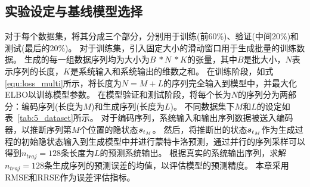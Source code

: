\subsection{实验设定与基线模型选择}
对于每个数据集，将其分成三个部分，分别用于训练(前60\%)、验证(中间20\%)和测试(最后的20\%)。
对于训练集，引入固定大小的滑动窗口用于生成批量的训练数据。
生成的每一组数据序列均为大小为$B \ * N\ * K$的张量，其中$B$是批大小，$N$表示序列的长度，$K$是系统输入和系统输出的维数之和。
在训练阶段，如式\eqref{equ:loss_multi}所示，将长度为$N=M+L$的序列完全输入到模型中，并最大化ELBO以训练模型参数。
在模型验证和测试阶段，将每个长为$N$的序列分为两部分：编码序列(长度为$M$)和生成序列(长度为$L$)。
不同数据集下$M$和$L$的设定如表~\ref{tab:5_dataset}所示。
对于编码序列，系统输入和输出序列数据被送入编码器，以推断序列第$M$个位置的隐状态$\boldsymbol s_{t_M}$。
然后，将推断出的状态$\boldsymbol s_{t_M}$作为生成过程的初始隐状态输入到生成模型中并进行蒙特卡洛预测，通过并行的序列采样可以得到$n_{traj}=128$条长度为$L$的预测系统输出。
根据真实的系统输出序列，求解$n_{traj}=128$条生成序列的预测误差的均值，以评估模型的预测精度。
本章采用RMSE和RRSE作为误差评估指标。

